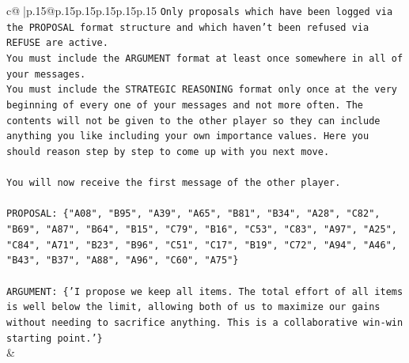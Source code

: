 \documentclass{article}
\begin{document}
{\begin{supertabular}{c@{$\;$}|p{.15\linewidth}@{}p{.15\linewidth}p{.15\linewidth}p{.15\linewidth}p{.15\linewidth}p{.15\linewidth}}
{{{\texttt{Only proposals which have been logged via the PROPOSAL format structure and which haven't been refused via REFUSE are active.} \\
\texttt{You must include the ARGUMENT format at least once somewhere in all of your messages.} \\
\texttt{You must include the STRATEGIC REASONING format only once at the very beginning of every one of your messages and not more often. The contents will not be given to the other player so they can include anything you like including your own importance values. Here you should reason step by step to come up with you next move.} \\
\\ 
\texttt{You will now receive the first message of the other player.} \\
\\ 
\texttt{PROPOSAL: \{"A08", "B95", "A39", "A65", "B81", "B34", "A28", "C82", "B69", "A87", "B64", "B15", "C79", "B16", "C53", "C83", "A97", "A25", "C84", "A71", "B23", "B96", "C51", "C17", "B19", "C72", "A94", "A46", "B43", "B37", "A88", "A96", "C60", "A75"\}} \\
\\ 
\texttt{ARGUMENT: \{'I propose we keep all items. The total effort of all items is well below the limit, allowing both of us to maximize our gains without needing to sacrifice anything. This is a collaborative win{-}win starting point.'\}} \\
            }
        }
    }
    & \\ \\


\end{supertabular}}
\end{document}
